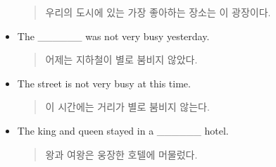 \documentclass{article}
\begin{document}
\begin{addmargin}[1em]{1em}
\begin{itemize}
\begin{quote}
    우리의 도시에 있는 가장 좋아하는 장소는 이 광장이다.
    \end{quote}
    \item The \_\_\_\_\_\_ was not very busy yesterday.
    \begin{quote}
    어제는 지하철이 별로 붐비지 않았다.
    \end{quote}
    \item The street is not very busy at this time.
    \begin{quote}
    이 시간에는 거리가 별로 붐비지 않는다.
    \end{quote}
    \item The king and queen stayed in a \_\_\_\_\_\_ hotel.
    \begin{quote}
    왕과 여왕은 웅장한 호텔에 머물렀다.
    \end{quote}
\end{itemize}
\end{addmargin}
\end{document}
